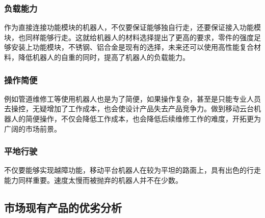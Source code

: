\documentclass[12pt]{article}
\begin{document}
\begin{CJK}{UTF8}{song}
\subsubsection{负载能力}
\label{sec:format}

作为直接连接功能模块的机器人，不仅要保证能够独自行走，还要保证接入功能模块，也同样能够行走。这就给机器人的材料选择提出了更高的要求，零件的强度足够安装上功能模块，不锈钢、铝合金是现有的选择，未来还可以使用高性能复合材料，降低机器人的自重的同时，提高了机器人的负载能力。
\subsubsection{操作简便}
\label{sec:format}

例如管道维修工等使用机器人也是为了简便，如果操作复杂，甚至是只能专业人员去操控，无疑增加了工作成本，也会使设计产品失去产品竞争力。做到移动云台机器人的简便操作，不仅会降低工作成本，也会降低后续维修工作的难度，开拓更为广阔的市场前景。
\subsubsection{平地行驶}
\label{sec:format}

不仅要能够实现越障功能，移动平台机器人在较为平坦的路面上，具有出色的行走能力同样重要。速度太慢而被抛弃的机器人并不在少数。

\subsection{市场现有产品的优劣分析}

\end{CJK}
\end{document}

